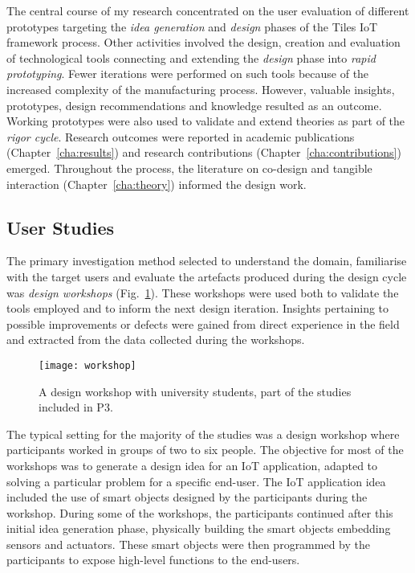 The central course of my research concentrated on the user evaluation of different prototypes targeting the \textit{idea generation} and \textit{design} phases of the Tiles IoT framework process. Other activities involved the design, creation and evaluation of technological tools connecting and extending the \textit{design} phase into \textit{rapid prototyping}. Fewer iterations were performed on such tools because of the increased complexity of the manufacturing process. However, valuable insights, prototypes, design recommendations and knowledge resulted as an outcome. Working prototypes were also used to validate and extend theories as part of the \emph{rigor cycle}.
Research outcomes were reported in academic publications (Chapter~\ref{cha:results}) and research contributions (Chapter~\ref{cha:contributions}) emerged. Throughout the process, the literature on co-design and tangible interaction (Chapter~\ref{cha:theory}) informed the design work.

\subsection{User Studies}
\label{sec:user-studies}

The primary investigation method selected to understand the domain, familiarise with the target users and evaluate the artefacts produced during the design cycle was \emph{design workshops} (Fig.~\ref{fig:workshop}). These workshops were used both to validate the tools employed and to inform the next design iteration. Insights pertaining to possible improvements or defects were gained from direct experience in the field and extracted from the data collected during the workshops.

\begin{figure}[ptb]
    \centering 
	\texttt{[image: workshop]}
	\caption{A design workshop with university students, part of the studies included in P3.}
	\label{fig:workshop}
\end{figure}

The typical setting for the majority of the studies was a design workshop where participants worked in groups of two to six people. The objective for most of the workshops was to generate a design idea for an IoT application, adapted to solving a particular problem for a specific end-user. The IoT application idea included the use of smart objects designed by the participants during the workshop. During some of the workshops, the participants continued after this initial idea generation phase, physically building the smart objects embedding sensors and actuators. These smart objects were then programmed by the participants to expose high-level functions to the end-users.

